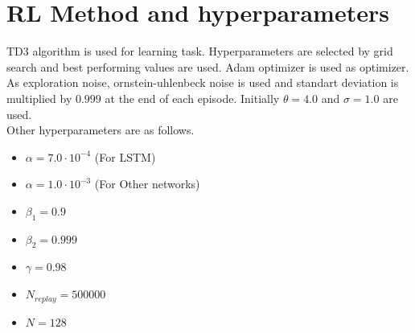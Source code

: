 \section{RL Method and hyperparameters}
TD3 algorithm is used for learning task. Hyperparameters are selected by grid search and best performing values are used. Adam optimizer is used as optimizer. \\
As exploration noise, ornstein-uhlenbeck noise is used and standart deviation is multiplied  by $0.999$ at the end of each episode. Initially $\theta=4.0$ and $\sigma=1.0$ are used. \\
Other hyperparameters are as follows. \\
\begin{itemize}
	\item $\alpha=7.0 \cdot 10^{-4}$ (For LSTM)
	\item $\alpha=1.0 \cdot 10^{-3}$ (For Other networks)
	\item $\beta_1=0.9$
	\item $\beta_2=0.999$
	\item $\gamma=0.98$
	\item $N_{replay} = 500000$
	\item $N = 128$
\end{itemize}

